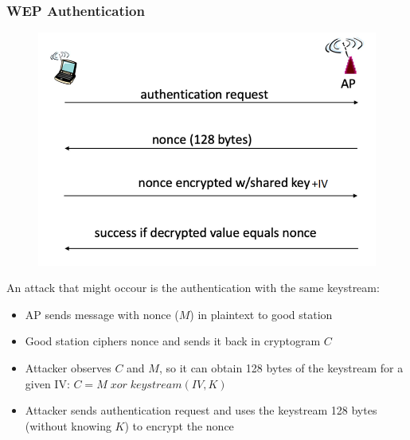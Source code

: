 \documentclass[10pt,a4paper]{report}
\begin{document}
\subsubsection{WEP Authentication}
\begin{figure}[H]
\centering
\includegraphics[scale=0.4]{35.png}
\end{figure}
An attack that might occour is the authentication with the same keystream:
\begin{itemize}
\item AP sends message with nonce ($M$) in plaintext to good station
\item Good station ciphers nonce and sends it back in cryptogram $C$
\item Attacker observes $C$ and $M$, so it can obtain 128 bytes of the keystream for a given IV: $C = M\; xor\; keystream(IV,K)$
\item Attacker sends authentication request and uses the keystream 128 bytes (without knowing $K$) to encrypt the nonce
\end{itemize}
\end{document}
